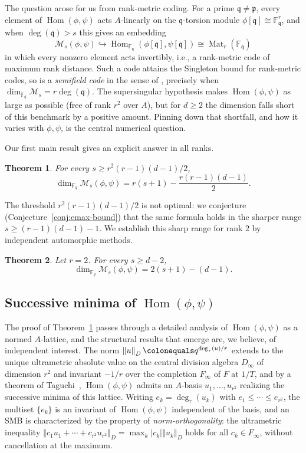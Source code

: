 \documentclass[12pt]{amsart}
\newtheorem{thm}{Theorem}[section]
\theoremstyle{definition}
\theoremstyle{remark}
\numberwithin{equation}{section}
\numberwithin{thm}{section}
\DeclareMathOperator{\Hom}{Hom}
\DeclareMathOperator{\Mat}{Mat}
\newcommand{\fp}{\mathfrak{p}}
\newcommand{\fq}{\mathfrak{q}}
\newcommand{\cM}{\mathcal{M}}
\newcommand{\F}{\mathbb{F}}
\newcommand{\Fi}{F_\infty}
\newcommand{\norm}[1]{\left\Vert#1\right\Vert}
\newcommand{\abs}[1]{\left|#1\right|}
\begin{document}
	The question arose for us from rank-metric coding. For a prime $\fq\neq \fp$, every element of $\Hom(\phi, \psi)$ acts $A$-linearly on the $\fq$-torsion module $\phi[\fq]\cong \F_\fq^r$, and when $\deg(\fq) > s$ this gives an embedding
	\[
	\cM_s(\phi, \psi) \hookrightarrow \Hom_{\F_\fq}(\phi[\fq], \psi[\fq])\cong \Mat_r(\F_\fq)
	\]
	in which every nonzero element acts invertibly, i.e., a rank-metric code of maximum rank distance. Such a code attains the Singleton bound for rank-metric codes, so is a \emph{semifield code} in the sense of \cite{MP1}, precisely when $\dim_{\F_q}\cM_s = r\deg(\fq)$. The supersingular hypothesis makes $\Hom(\phi, \psi)$ as large as possible (free of rank $r^2$ over $A$), but for $d\geq 2$ the dimension falls short of this benchmark by a positive amount. Pinning down that shortfall, and how it varies with $\phi, \psi$, is the central numerical question.
	
	Our first main result gives an explicit answer in all ranks.
	
	\begin{thm}\label{thmA}
		For every $s\geq r^2(r-1)(d-1)/2$,
		\[
		\dim_{\F_q}\cM_s(\phi, \psi) = r(s+1) - \frac{r(r-1)(d-1)}{2}.
		\]
	\end{thm}
	
	The threshold $r^2(r-1)(d-1)/2$ is not optimal: we conjecture (Conjecture~\ref{conj:emax-bound}) that the same formula holds in the sharper range $s\geq (r-1)(d-1) - 1$. We establish this sharp range for rank $2$ by independent automorphic methods.
	
	\begin{thm}\label{thmB}
		Let $r = 2$. For every $s\geq d - 2$,
		\[
		\dim_{\F_q}\cM_s(\phi, \psi) = 2(s+1) - (d-1).
		\]
	\end{thm}
	
	\subsection*{Successive minima of \texorpdfstring{$\Hom(\phi, \psi)$}{Hom(phi,psi)}}
	
	The proof of Theorem~\ref{thmA} passes through a detailed analysis of $\Hom(\phi, \psi)$ as a normed $A$-lattice, and the structural results that emerge are, we believe, of independent interest. The norm $\norm{u}_D \colonequals q^{\deg_\tau(u)/r}$ extends to the unique ultrametric absolute value on the central division algebra $D_\infty$ of dimension $r^2$ and invariant $-1/r$ over the completion $\Fi$ of $F$ at $1/T$, and by a theorem of Taguchi~\cite[\S 4]{Taguchi}, $\Hom(\phi, \psi)$ admits an $A$-basis $u_1, \ldots, u_{r^2}$ realizing the successive minima of this lattice. Writing $e_k = \deg_\tau(u_k)$ with $e_1 \leq \cdots \leq e_{r^2}$, the multiset $\{e_k\}$ is an invariant of $\Hom(\phi, \psi)$ independent of the basis, and an SMB is characterized by the property of \emph{norm-orthogonality}: the ultrametric inequality $\norm{c_1 u_1 + \cdots + c_{r^2} u_{r^2}}_D = \max_k \abs{c_k}\norm{u_k}_D$ holds for all $c_k\in \Fi$, without cancellation at the maximum.
	
\end{document}
